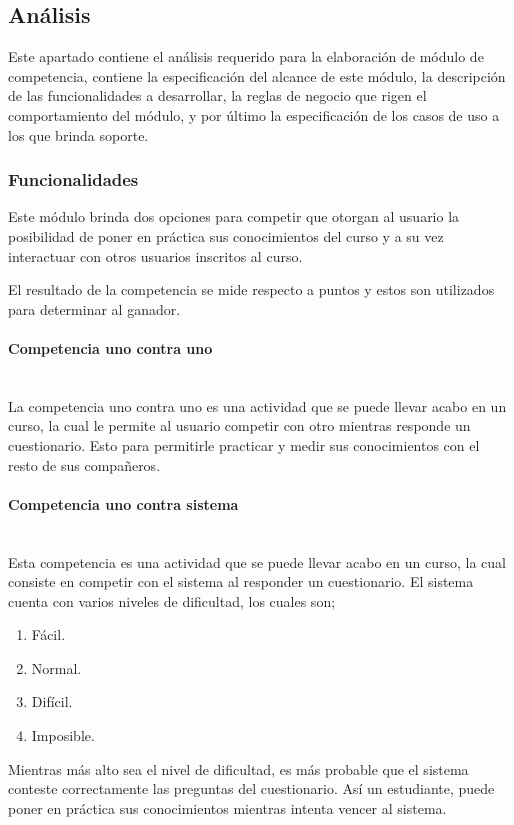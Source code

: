 
\subsection{Análisis}

 Este apartado contiene el análisis requerido para la elaboración de módulo de competencia,
 contiene la especificación del alcance de este módulo, la descripción de las funcionalidades
 a desarrollar, la reglas de negocio que rigen el comportamiento del módulo, y por último la
 especificación de los casos de uso a los que brinda soporte.\\


\subsubsection{Funcionalidades}

\noindent
Este módulo brinda dos opciones para competir que otorgan al usuario
la posibilidad de poner en práctica sus conocimientos del curso y a su vez
interactuar con otros usuarios inscritos al curso.

\noindent El resultado de la competencia se mide respecto a puntos y estos son
utilizados para determinar al ganador.

\paragraph{Competencia uno contra uno}\mbox{}\\
La competencia uno contra uno es una actividad que se puede llevar acabo en un curso,
la cual le permite al usuario competir con otro mientras responde un cuestionario.
Esto para permitirle practicar y medir sus conocimientos con el resto de sus compañeros.\\
\paragraph{Competencia uno contra sistema}\mbox{}\\
 Esta competencia es una actividad que se puede llevar acabo en un curso, la cual consiste en competir con el sistema al responder un cuestionario.
 El sistema cuenta con varios niveles de dificultad, los cuales son; \\
 \begin{enumerate}
   \item Fácil.
   \item Normal.
   \item Difícil.
   \item Imposible.
 \end{enumerate}
 \noindent Mientras más alto sea el nivel de dificultad, es más probable que el sistema conteste correctamente las preguntas del cuestionario.
 Así un estudiante, puede poner en práctica sus conocimientos mientras intenta vencer al sistema.

